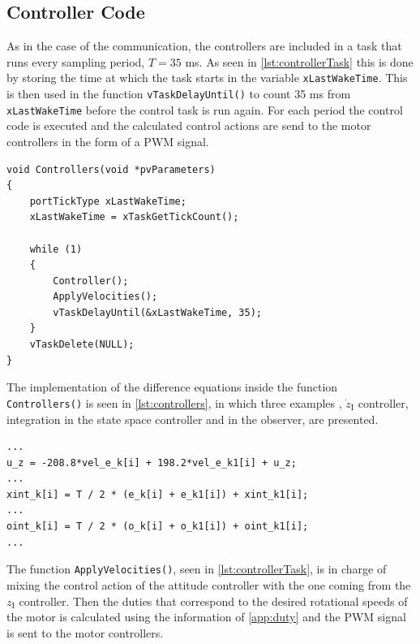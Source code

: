 \subsection{Controller Code}
As in the case of the communication, the controllers are included in a task that runs every sampling period, $T = 35$ \si{ms}. As seen in \autoref{lst:controllerTask} this is done by storing the time at which the task starts in the variable \lstinline[style=customcppinline]{xLastWakeTime}. This is then used in the function \lstinline[style=customcppinline]{vTaskDelayUntil()} to count 35 ms from \lstinline[style=customcppinline]{xLastWakeTime} before the control task is run again. For each period the control code is executed and the calculated control actions are send to the motor controllers in the form of a PWM signal.



\begin{lstlisting}[style=customcpp,
caption={Code for the controller task.}, 
label=lst:controllerTask]
void Controllers(void *pvParameters)
{
	portTickType xLastWakeTime;
	xLastWakeTime = xTaskGetTickCount();
	
	while (1)
	{
		Controller();
		ApplyVelocities();
		vTaskDelayUntil(&xLastWakeTime, 35);
	}
	vTaskDelete(NULL);
}
\end{lstlisting}

The implementation of the difference equations inside the function \lstinline[style=customcppinline]{Controllers()} is seen in \autoref{lst:controllers}, in which three examples , $\dot{z}_{\mathrm{I}}$ controller, integration in the state space controller and in the observer, are presented.

\begin{lstlisting}[style=customcpp,
caption={Code for the controllers.}, 
label=lst:controllers]
...
u_z = -208.8*vel_e_k[i] + 198.2*vel_e_k1[i] + u_z;
...
xint_k[i] = T / 2 * (e_k[i] + e_k1[i]) + xint_k1[i];
...
oint_k[i] = T / 2 * (o_k[i] + o_k1[i]) + oint_k1[i];
...

\end{lstlisting}

The function \lstinline[style=customcppinline]{ApplyVelocities()}, seen in \autoref{lst:controllerTask}, is in charge of mixing the control action of the attitude controller with the one coming from the $z_{\mathrm{I}}$ controller. Then the duties that correspond to the desired rotational speeds of the motor is calculated using the information of \autoref{app:duty} and the PWM signal is sent to the motor controllers.











